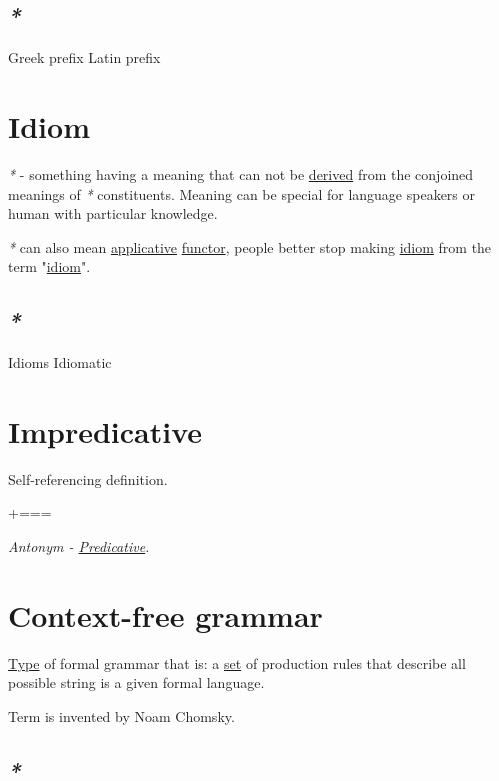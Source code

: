 \documentclass[a4paper,14pt,oneside]{book}
\newcommand{\additional}{{\scriptsize +===}}    %
\begin{document}
\subsection{\emph{*}}
\label{sec:orgaaf837f}

\label{orgae5cf93}Greek prefix
\label{orgbac7301}Latin prefix

\section{\label{org1c21dbd}Idiom}
\label{sec:org2aef558}
\emph{*} - something having a meaning that can not be \hyperref[org20723bb]{derived} from the conjoined meanings of \emph{*} constituents.
Meaning can be special for language speakers or human with particular knowledge.

\emph{*} can also mean \hyperref[org1389850]{applicative} \hyperref[orgc667983]{functor}, people better stop making \hyperref[org1c21dbd]{idiom} from the term "\hyperref[org1c21dbd]{idiom}".

\subsection{\emph{*}}
\label{sec:org3928f4a}

\label{org95d54a3}Idioms
\label{org9ef8849}Idiomatic

\section{\label{org236f582}Impredicative}
\label{sec:org2cbd11e}
Self-referencing definition.

\additional

\emph{Antonym - \hyperref[org522afd4]{Predicative}.}

\section{\label{org788a76a}Context-free grammar}
\label{sec:org42b51cc}
\hyperref[org1c12b47]{Type} of formal grammar that is: a \hyperref[orgb802935]{set} of production rules that describe all possible string is a given formal language.

Term is invented by Noam Chomsky.

\subsection{\emph{*}}
\label{sec:org83fc362}
\end{document}
